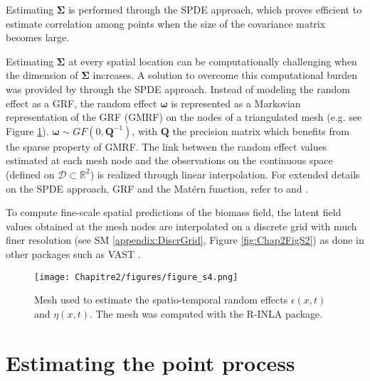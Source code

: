 Estimating $\mathbf{\Sigma}$ is performed through the SPDE approach, which proves efficient to estimate correlation among points when the size of the covariance matrix becomes large.

Estimating $\mathbf{\Sigma}$ at every spatial location can be computationally challenging when the dimension of $\mathbf{\Sigma}$ increases. A solution to overcome this computational burden was provided by \textcite{lindgren-explicit-2011} through the SPDE approach. Instead of modeling the random effect as a GRF, the random effect $\boldsymbol{\omega}$ is represented as a Markovian representation of the GRF (GMRF) on the nodes of a triangulated mesh (e.g. see Figure \ref{fig:Chap2FigS4}). $\boldsymbol{\omega} \sim GF( 0,\mathbf{Q}^{-1} )$, with $\mathbf{Q}$ the precision matrix which benefits from the sparse property of GMRF. The link between the random effect values estimated at each mesh node and the observations on the continuous space (defined on $\mathcal{D} \subset \mathbb{R}^2$) is realized through linear interpolation. For extended details on the SPDE approach, GRF and the Matérn function, refer to \textcite{lindgren-explicit-2011} and \textcite{cameletti-spatio-temporal-2013}.

To compute fine-scale spatial predictions of the biomass field, the latent field values obtained at the mesh nodes are interpolated on a discrete grid with much finer resolution (see SM \ref{appendix:DiscrGrid}, Figure \ref{fig:Chap2FigS2}) as done in other packages such as VAST \parencite{thorson-guidance-2019}.

\newpage

\begin{figure}[H]
   \begin{center}
      \texttt{[image: Chapitre2/figures/figure\_s4.png]}
   \end{center}
   \caption[Mesh used to estimate the spatio-temporal random effects $\epsilon(x,t)$ and $\eta(x,t)$.]
   {Mesh used to estimate the spatio-temporal random effects $\epsilon(x,t)$ and $\eta(x,t)$. The mesh was computed with the R-INLA package.}
   \label{fig:Chap2FigS4}
\end{figure}

\newpage

\section{Estimating the point process}\label{appendix:PointProcessEst}


